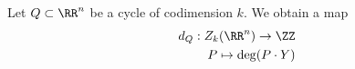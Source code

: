 

    Let $Q\subset \RR^n$ be a cycle of codimension $k$. We obtain a map 
    \begin{align*}
        d_Q: Z_k(\RR^n)\to \ZZ\\
        P\mapsto \deg(P\cdot Y)
    \end{align*}

